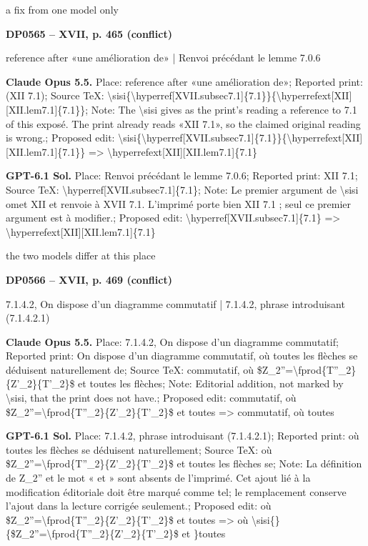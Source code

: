a fix from one model only\par
\par\noindent\hypertarget{DP0565}{}\textbf{DP0565 -- XVII, p. 465 (conflict)}\par
reference after «une amélioration de» | Renvoi précédant le lemme 7.0.6\par
\textbf{Claude Opus 5.5.} Place: reference after «une amélioration de»; Reported print: (XII 7.1); Source TeX: \textbackslash{}sisi\{\textbackslash{}hyperref[XVII.subsec7.1]\{7.1\}\}\{\textbackslash{}hyperrefext[XII][XII.lem7.1]\{7.1\}\}; Note: The \textbackslash{}sisi gives as the print's reading a reference to 7.1 of this exposé. The print already reads «XII 7.1», so the claimed original reading is wrong.; Proposed edit: \textbackslash{}sisi\{\textbackslash{}hyperref[XVII.subsec7.1]\{7.1\}\}\{\textbackslash{}hyperrefext[XII][XII.lem7.1]\{7.1\}\} =\allowbreak > \textbackslash{}hyperrefext[XII][XII.lem7.1]\{7.1\}\par
\textbf{GPT-6.1 Sol.} Place: Renvoi précédant le lemme 7.0.6; Reported print: XII 7.1; Source TeX: \textbackslash{}hyperref[XVII.subsec7.1]\{7.1\}; Note: Le premier argument de \textbackslash{}sisi omet XII et renvoie à XVII 7.1. L'imprimé porte bien XII 7.1 ; seul ce premier argument est à modifier.; Proposed edit: \textbackslash{}hyperref[XVII.subsec7.1]\{7.1\} =\allowbreak > \textbackslash{}hyperrefext[XII][XII.lem7.1]\{7.1\}\par
the two models differ at this place\par
\par\noindent\hypertarget{DP0566}{}\textbf{DP0566 -- XVII, p. 469 (conflict)}\par
7.1.4.2, On dispose d'un diagramme commutatif | 7.1.4.2, phrase introduisant (7.1.4.2.1)\par
\textbf{Claude Opus 5.5.} Place: 7.1.4.2, On dispose d'un diagramme commutatif; Reported print: On dispose d'un diagramme commutatif, où toutes les flèches se déduisent naturellement de; Source TeX: commutatif, où \$Z\_2''=\allowbreak \textbackslash{}fprod\{T''\_2\}\{Z'\_2\}\{T'\_2\}\$ et toutes les flèches; Note: Editorial addition, not marked by \textbackslash{}sisi, that the print does not have.; Proposed edit: commutatif, où \$Z\_2''=\allowbreak \textbackslash{}fprod\{T''\_2\}\{Z'\_2\}\{T'\_2\}\$ et toutes =\allowbreak > commutatif, où toutes\par
\textbf{GPT-6.1 Sol.} Place: 7.1.4.2, phrase introduisant (7.1.4.2.1); Reported print: où toutes les flèches se déduisent naturellement; Source TeX: où \$Z\_2''=\allowbreak \textbackslash{}fprod\{T''\_2\}\{Z'\_2\}\{T'\_2\}\$ et toutes les flèches se; Note: La définition de Z\_2'' et le mot « et » sont absents de l'imprimé. Cet ajout lié à la modification éditoriale doit être marqué comme tel; le remplacement conserve l'ajout dans la lecture corrigée seulement.; Proposed edit: où \$Z\_2''=\allowbreak \textbackslash{}fprod\{T''\_2\}\{Z'\_2\}\{T'\_2\}\$ et toutes =\allowbreak > où \textbackslash{}sisi\{\}\{\$Z\_2''=\allowbreak \textbackslash{}fprod\{T''\_2\}\{Z'\_2\}\{T'\_2\}\$ et \}toutes\par
